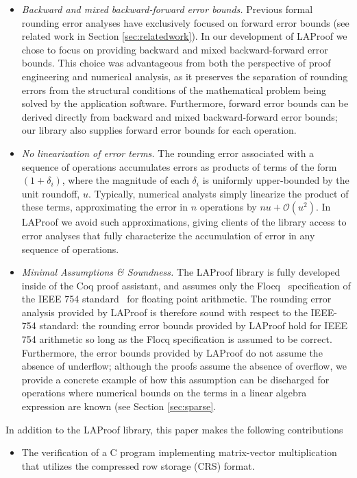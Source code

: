 \documentclass[conference]{IEEEtran}
\begin{document}
\begin{itemize}
    \item \emph{Backward and mixed backward-forward error bounds.} Previous formal rounding error analyses have exclusively focused on forward error bounds (see related work in Section \ref{sec:relatedwork}). In our development of LAProof we chose to focus on providing backward and mixed backward-forward error bounds. This choice was advantageous from both the perspective of proof engineering and numerical analysis, as it preserves the separation of rounding errors from the structural conditions of the mathematical problem being solved by the application software. Furthermore, forward error bounds can be derived directly from backward and mixed backward-forward error bounds; our library also supplies forward error bounds for each operation. 
    \item \emph{No linearization of error terms.} The rounding error associated with a sequence of operations accumulates errors as products of terms of the form $(1+\delta_i)$, where the magnitude of each $\delta_i$ is uniformly upper-bounded by the unit roundoff, $u$. Typically, numerical analysts simply linearize the product of these terms, approximating the error in $n$ operations by $nu + \mathcal{O}(u^2)$. In LAProof we avoid such approximations, giving clients of the library access to error analyses that fully characterize the accumulation of error in any sequence of operations. 
    \item \emph{Minimal Assumptions \& Soundness.} The LAProof library is fully developed inside of the Coq proof assistant, and assumes only the Flocq~\cite{flocq} specification of the IEEE 754 standard~\cite{IEEEstd} for floating point arithmetic. The rounding error analysis provided by LAProof is therefore sound with respect to the IEEE-754 standard: the rounding error bounds provided by LAProof hold for IEEE 754 arithmetic so long as the Flocq specification is assumed to be correct. Furthermore, the error bounds provided by LAProof do not assume the absence of underflow; although the proofs assume the absence of overflow, we provide a concrete example of how this assumption can be discharged for operations where numerical bounds on the terms in a linear algebra expression are known (see Section \ref{sec:sparse}. 
\end{itemize}

In addition to the LAProof library, this paper makes the following contributions 
\begin{itemize}
    \item The verification of a C program implementing matrix-vector multiplication that utilizes the compressed row storage (CRS) format. 
\end{itemize}
\end{document}
